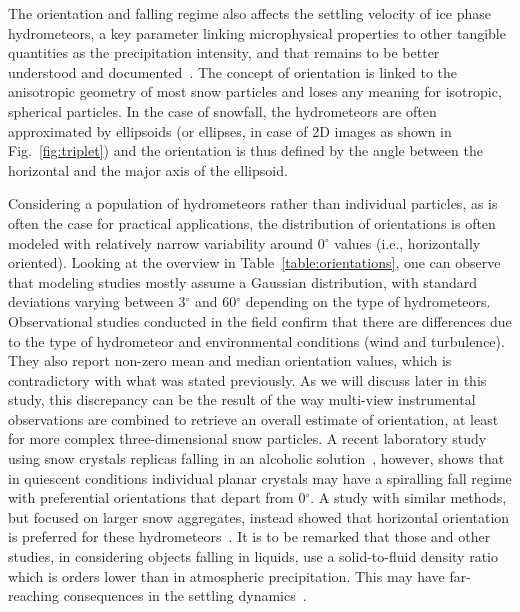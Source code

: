 \documentclass[draft]{agujournal2019}
\begin{document}
The orientation and falling regime also affects the settling velocity of ice phase hydrometeors, a key parameter linking microphysical properties to other tangible quantities as the precipitation intensity, and that remains to be better understood and documented~\cite{Heymsfield_JAS_2004}.
The concept of orientation is linked to the anisotropic geometry of most snow particles and loses any meaning for isotropic, spherical particles. In the case of snowfall, the hydrometeors are often approximated by ellipsoids (or ellipses, in case of 2D images as shown in Fig.~\ref{fig:triplet}) and the orientation is thus defined by the angle between the horizontal and the major axis of the ellipsoid.

Considering a population of hydrometeors rather than individual particles, as is often the case for practical applications, the distribution of orientations is often modeled with relatively narrow variability around 0$^\circ$ values (i.e., horizontally oriented). Looking at the overview in Table~\ref{table:orientations}, one can observe that modeling studies mostly assume a Gaussian distribution, with standard deviations varying between 3$^\circ$ \cite{Matrosov_JAM_2001} and 60$^\circ$ \cite{Putnam_MWR_2017} depending on the type of hydrometeors. Observational studies conducted in the field \cite{Garrett_GRL_2015} confirm that there are differences due to the type of hydrometeor and environmental conditions (wind and turbulence). They also report non-zero mean and median orientation values, which is contradictory with what was stated previously. As we will discuss later in this study, this discrepancy can be the result of the way multi-view instrumental observations are combined to retrieve an overall estimate of orientation, at least for more complex three-dimensional snow particles. A recent laboratory study using snow crystals replicas falling in an alcoholic solution~\cite{Stout_ACP_2024}, however, shows that in quiescent conditions individual planar crystals may have a spiralling fall regime with preferential orientations that depart from 0$^\circ$. A study with similar methods, but focused on larger snow aggregates, instead showed that horizontal orientation is preferred for these hydrometeors~\cite{Koebschall_EF_2023}. It is to be remarked that those and other studies, in considering objects falling in liquids, use a solid-to-fluid density ratio which is orders lower than in atmospheric precipitation. This may have far-reaching consequences in the settling dynamics~\cite{Tinklenberg_JFM_2023,Tinklenberg_JFM_2024}. 
\end{document}
